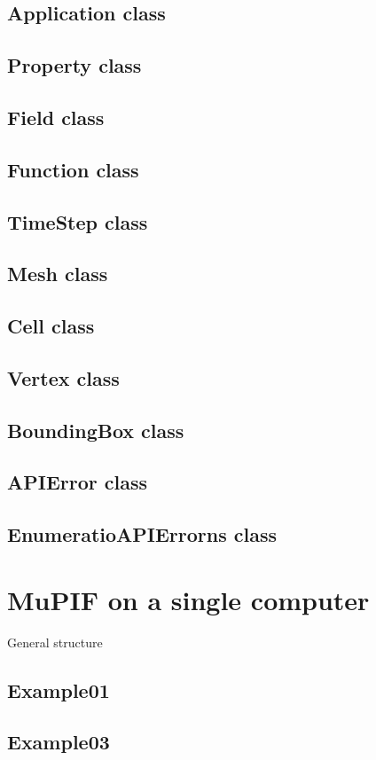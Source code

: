 \documentclass[a4paper,11pt]{article}
\begin{document}
\subsection{Application class}
\subsection{Property class}
\subsection{Field class}
\subsection{Function class}
\subsection{TimeStep class}
\subsection{Mesh class}
\subsection{Cell class}
\subsection{Vertex class}
\subsection{BoundingBox class}
\subsection{APIError class}
\subsection{EnumeratioAPIErrorns class}


\section{MuPIF on a single computer}

General structure

\subsection{Example01}
\subsection{Example03}
\end{document}
